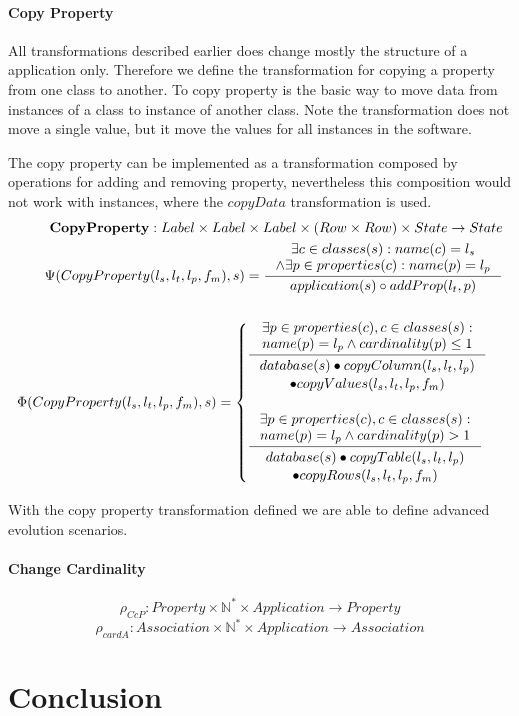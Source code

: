 \documentclass[11pt]{article}
\begin{document}
\paragraph{Copy Property}
All transformations described earlier does change mostly the structure of a application only. Therefore we define  the transformation for copying a property from one class to another. To copy property is the basic way to move data from instances of a class to instance of another class. Note the transformation does not move a single value, but it move the values for all instances in the software.

The copy property can be implemented as a transformation composed by operations for adding and removing property, nevertheless this composition would not work with instances, where the $copyData$ transformation is used.
\begin{align*}
	\mathbf{CopyProperty} : Label \times Label \times Label \times (Row \times Row) \times State \rightarrow State \\
	\Psi(CopyProperty(l_s, l_t, l_p, f_m), s) = \inference{\exists c \in classes(s) : name(c) = l_s \\ \wedge \exists p \in properties(c) : name(p) = l_p }{application(s) \circ addProp(l_t, p)} \\\\
	\Phi(CopyProperty(l_s, l_t, l_p, f_m), s) = \begin{cases}
		\inference{\exists p \in properties(c), c \in classes(s) : \\ name(p) = l_p \wedge cardinality(p) \leq 1 }{\begin{gathered}
			database(s) \bullet copyColumn(l_s, l_t, l_p) \\ \bullet copyValues(l_s, l_t, l_p, f_m) 
			\end{gathered}} \\ \\
		\inference{\exists p \in properties(c), c \in classes(s) : \\ name(p) = l_p \wedge cardinality(p) > 1}{\begin{gathered}
			database(s) \bullet copyTable(l_s, l_t, l_p) \\ \bullet copyRows(l_s, l_t, l_p, f_m) 
			\end{gathered}}
 \end{cases}
\end{align*}

With the copy property transformation defined we are able to define advanced evolution scenarios.

\paragraph{Change Cardinality}
$$\rho_{CcP} : Property \times \mathbb{N^{*}} \times Application \rightarrow Property $$
$$\rho_{cardA} : Association \times \mathbb{N^{*}} \times Application \rightarrow Association $$

\section{Conclusion}
\end{document}
